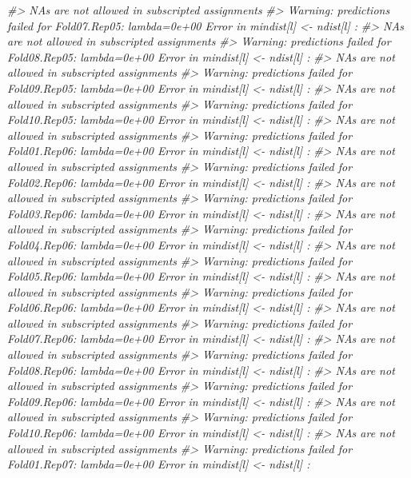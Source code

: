\documentclass[]{book}
\newenvironment{Shaded}{\begin{snugshade}}{\end{snugshade}}
\newcommand{\CommentTok}[1]{\textcolor[rgb]{0.56,0.35,0.01}{\textit{#1}}}
\begin{document}
\begin{Shaded}
\begin{Highlighting}[]
\CommentTok{#>   NAs are not allowed in subscripted assignments}
\CommentTok{#> Warning: predictions failed for Fold07.Rep05: lambda=0e+00 Error in mindist[l] <- ndist[l] : }
\CommentTok{#>   NAs are not allowed in subscripted assignments}
\CommentTok{#> Warning: predictions failed for Fold08.Rep05: lambda=0e+00 Error in mindist[l] <- ndist[l] : }
\CommentTok{#>   NAs are not allowed in subscripted assignments}
\CommentTok{#> Warning: predictions failed for Fold09.Rep05: lambda=0e+00 Error in mindist[l] <- ndist[l] : }
\CommentTok{#>   NAs are not allowed in subscripted assignments}
\CommentTok{#> Warning: predictions failed for Fold10.Rep05: lambda=0e+00 Error in mindist[l] <- ndist[l] : }
\CommentTok{#>   NAs are not allowed in subscripted assignments}
\CommentTok{#> Warning: predictions failed for Fold01.Rep06: lambda=0e+00 Error in mindist[l] <- ndist[l] : }
\CommentTok{#>   NAs are not allowed in subscripted assignments}
\CommentTok{#> Warning: predictions failed for Fold02.Rep06: lambda=0e+00 Error in mindist[l] <- ndist[l] : }
\CommentTok{#>   NAs are not allowed in subscripted assignments}
\CommentTok{#> Warning: predictions failed for Fold03.Rep06: lambda=0e+00 Error in mindist[l] <- ndist[l] : }
\CommentTok{#>   NAs are not allowed in subscripted assignments}
\CommentTok{#> Warning: predictions failed for Fold04.Rep06: lambda=0e+00 Error in mindist[l] <- ndist[l] : }
\CommentTok{#>   NAs are not allowed in subscripted assignments}
\CommentTok{#> Warning: predictions failed for Fold05.Rep06: lambda=0e+00 Error in mindist[l] <- ndist[l] : }
\CommentTok{#>   NAs are not allowed in subscripted assignments}
\CommentTok{#> Warning: predictions failed for Fold06.Rep06: lambda=0e+00 Error in mindist[l] <- ndist[l] : }
\CommentTok{#>   NAs are not allowed in subscripted assignments}
\CommentTok{#> Warning: predictions failed for Fold07.Rep06: lambda=0e+00 Error in mindist[l] <- ndist[l] : }
\CommentTok{#>   NAs are not allowed in subscripted assignments}
\CommentTok{#> Warning: predictions failed for Fold08.Rep06: lambda=0e+00 Error in mindist[l] <- ndist[l] : }
\CommentTok{#>   NAs are not allowed in subscripted assignments}
\CommentTok{#> Warning: predictions failed for Fold09.Rep06: lambda=0e+00 Error in mindist[l] <- ndist[l] : }
\CommentTok{#>   NAs are not allowed in subscripted assignments}
\CommentTok{#> Warning: predictions failed for Fold10.Rep06: lambda=0e+00 Error in mindist[l] <- ndist[l] : }
\CommentTok{#>   NAs are not allowed in subscripted assignments}
\CommentTok{#> Warning: predictions failed for Fold01.Rep07: lambda=0e+00 Error in mindist[l] <- ndist[l] : }

\end{Highlighting}
\end{Shaded}
\end{document}
